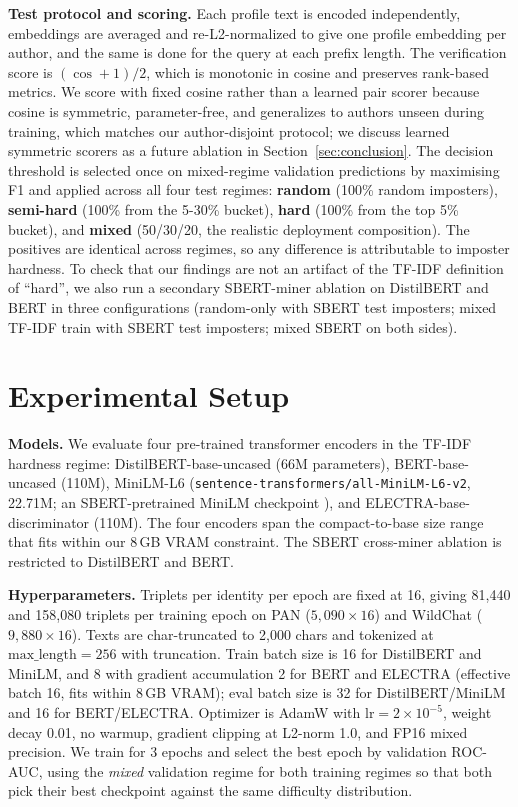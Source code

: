 \documentclass[11pt]{article}
\begin{document}
\noindent\textbf{Test protocol and scoring.} Each profile text is encoded independently, embeddings are averaged and re-L2-normalized to give one profile embedding per author, and the same is done for the query at each prefix length. The verification score is $(\cos+1)/2$, which is monotonic in cosine and preserves rank-based metrics. We score with fixed cosine rather than a learned pair scorer because cosine is symmetric, parameter-free, and generalizes to authors unseen during training, which matches our author-disjoint protocol; we discuss learned symmetric scorers as a future ablation in Section~\ref{sec:conclusion}. The decision threshold is selected once on mixed-regime validation predictions by maximising F1 and applied across all four test regimes: \textbf{random} (100\% random imposters), \textbf{semi-hard} (100\% from the 5-30\% bucket), \textbf{hard} (100\% from the top 5\% bucket), and \textbf{mixed} (50/30/20, the realistic deployment composition). The positives are identical across regimes, so any difference is attributable to imposter hardness. To check that our findings are not an artifact of the TF-IDF definition of ``hard'', we also run a secondary SBERT-miner ablation on DistilBERT and BERT in three configurations (random-only with SBERT test imposters; mixed TF-IDF train with SBERT test imposters; mixed SBERT on both sides).

\section{Experimental Setup}
\label{sec:expsetup}

\noindent\textbf{Models.} We evaluate four pre-trained transformer encoders in the TF-IDF hardness regime: DistilBERT-base-uncased \citep{sanh2019distilbert} (66M parameters), BERT-base-uncased \citep{devlin2019bert} (110M), MiniLM-L6 (\texttt{sentence-transformers/all-MiniLM-L6-v2}, 22.71M; an SBERT-pretrained MiniLM checkpoint \citep{reimers2019sentencebert}), and ELECTRA-base-discriminator \citep{clark2020electra} (110M). The four encoders span the compact-to-base size range that fits within our 8\,GB VRAM constraint. The SBERT cross-miner ablation is restricted to DistilBERT and BERT.

\noindent\textbf{Hyperparameters.} Triplets per identity per epoch are fixed at 16, giving 81{,}440 and 158{,}080 triplets per training epoch on PAN ($5{,}090 \times 16$) and WildChat ($9{,}880 \times 16$). Texts are char-truncated to 2{,}000 chars and tokenized at $\text{max\_length}=256$ with truncation. Train batch size is 16 for DistilBERT and MiniLM, and 8 with gradient accumulation 2 for BERT and ELECTRA (effective batch 16, fits within 8\,GB VRAM); eval batch size is 32 for DistilBERT/MiniLM and 16 for BERT/ELECTRA. Optimizer is AdamW with $\text{lr}=2\!\times\!10^{-5}$, weight decay 0.01, no warmup, gradient clipping at L2-norm 1.0, and FP16 mixed precision. We train for 3 epochs and select the best epoch by validation ROC-AUC, using the \textit{mixed} validation regime for both training regimes so that both pick their best checkpoint against the same difficulty distribution.
\end{document}
